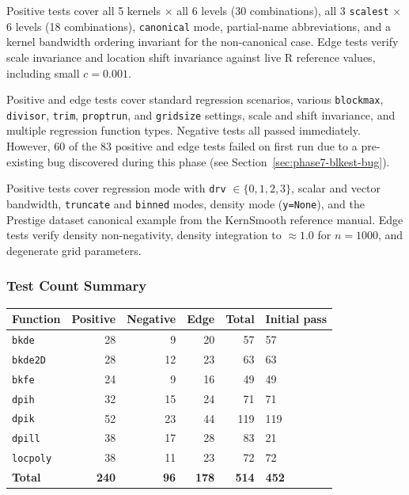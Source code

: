 \documentclass[12pt,a4paper]{article}
\begin{document}
\begin{description}
    Positive tests cover all 5 kernels $\times$ all 6 levels (30 combinations), all 3 \texttt{scalest} $\times$ 6 levels (18 combinations), \texttt{canonical} mode, partial-name abbreviations, and a kernel bandwidth ordering invariant for the non-canonical case. Edge tests verify scale invariance and location shift invariance against live R reference values, including small $c = 0.001$.
  \item[\texttt{dpill}]
    Positive and edge tests cover standard regression scenarios, various \texttt{blockmax}, \texttt{divisor}, \texttt{trim}, \texttt{proptrun}, and \texttt{gridsize} settings, scale and shift invariance, and multiple regression function types. Negative tests all passed immediately. However, 60 of the 83 positive and edge tests failed on first run due to a pre-existing bug discovered during this phase (see Section~\ref{sec:phase7-blkest-bug}).
  \item[\texttt{locpoly}]
    Positive tests cover regression mode with \texttt{drv} $\in \{0, 1, 2, 3\}$, scalar and vector bandwidth, \texttt{truncate} and \texttt{binned} modes, density mode (\texttt{y=None}), and the Prestige dataset canonical example from the KernSmooth reference manual. Edge tests verify density non-negativity, density integration to $\approx 1.0$ for $n = 1000$, and degenerate grid parameters.
\end{description}

\subsubsection{Test Count Summary}

\begin{center}
\begin{tabular}{lrrrrl}
\toprule
Function & Positive & Negative & Edge & Total & Initial pass \\
\midrule
\texttt{bkde}    & 28 &  9 & 20 &  57 & 57 \\
\texttt{bkde2D}  & 28 & 12 & 23 &  63 & 63 \\
\texttt{bkfe}    & 24 &  9 & 16 &  49 & 49 \\
\texttt{dpih}    & 32 & 15 & 24 &  71 & 71 \\
\texttt{dpik}    & 52 & 23 & 44 & 119 & 119 \\
\texttt{dpill}   & 38 & 17 & 28 &  83 & 21 \\
\texttt{locpoly} & 38 & 11 & 23 &  72 & 72 \\
\midrule
\textbf{Total}   & \textbf{240} & \textbf{96} & \textbf{178} & \textbf{514} & \textbf{452} \\
\bottomrule
\end{tabular}
\end{center}
\end{document}
